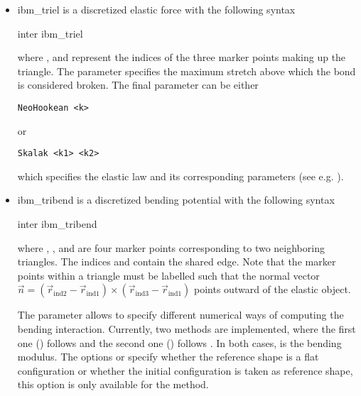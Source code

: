 \begin{itemize}
\item ibm\_triel is a discretized elastic force with the following syntax
\begin{essyntax}
  inter  ibm_triel     
  \begin{features}
  \end{features}
\end{essyntax}
where ,  and  represent the indices of the three marker points making up the triangle. The parameter 
specifies the maximum stretch above which the bond is considered broken. The final parameter  can be either
\begin{verbatim}
NeoHookean <k>
\end{verbatim}
or
\begin{verbatim}
Skalak <k1> <k2>
\end{verbatim}
which specifies the elastic law and its corresponding parameters (see e.g. \cite{KruegerThesis}). 

\item ibm\_tribend is a discretized bending potential with the following syntax
\begin{essyntax}
  inter  ibm_tribend       
  \begin{features}
  \end{features}
\end{essyntax}
where , ,  and  are four marker points corresponding to two neighboring triangles. The indices  and  contain the shared edge. Note that the marker points within a triangle must be labelled such that the normal vector $\vec{n} = (\vec{r}_\text{ind2} - \vec{r}_\text{ind1}) \times (\vec{r}_\text{ind3} - \vec{r}_\text{ind1})$ points outward of the elastic object. 

The parameter  allows to specify different numerical ways of computing the bending interaction. Currently, two methods are implemented, where the first one () follows \cite{KruegerThesis} and the second one () follows \cite{Gompper1996}. In both cases,  is the bending modulus. The options  or  specify whether the reference shape is a flat configuration or whether the initial configuration is taken as reference shape, this option is only available for the  method.


\end{itemize}
